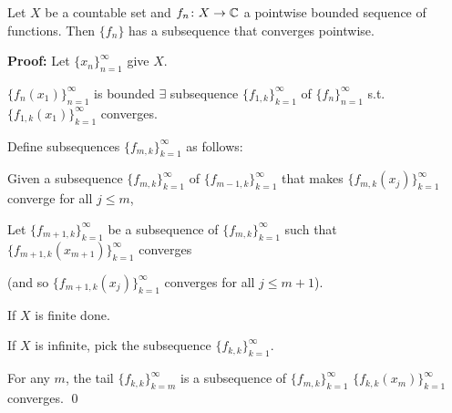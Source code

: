 \documentclass[10pt,aspectratio=169]{beamer}
\begin{document}
\begin{frame}
\begin{proposition}
Let $X$ be a countable set and $f_n \colon X \to {\mathbb{C}}$ a pointwise bounded
sequence of functions.  Then $\{ f_n \}$ has a subsequence that converges
pointwise.
\end{proposition}

\pause

\textbf{Proof:}
Let $\{ x_n \}_{n=1}^{\infty}$ give $X$.

\pause
\medskip

$\{ f_n(x_1) \}_{n=1}^\infty$ is bounded
\wthus
$\exists$
subsequence
$\{ f_{1,k} \}_{k=1}^\infty$
of $\{ f_n \}_{n=1}^{\infty}$
s.t.
$\{ f_{1,k}(x_1) \}_{k=1}^\infty$ converges.


\medskip
\pause

Define subsequences $\{ f_{m,k} \}_{k=1}^\infty$ as follows:

\pause
\medskip

Given a subsequence
$\{ f_{m,k} \}_{k=1}^\infty$ of
$\{ f_{m-1,k} \}_{k=1}^\infty$
that makes $\{ f_{m,k}(x_j) \}_{k=1}^\infty$ converge for all $j \leq m$,
\pause

Let $\{ f_{m+1,k} \}_{k=1}^\infty$ be a subsequence of $\{ f_{m,k} \}_{k=1}^\infty$
such that
$\{ f_{m+1,k}(x_{m+1}) \}_{k=1}^\infty$ converges

\pause
(and so 
$\{ f_{m+1,k}(x_{j}) \}_{k=1}^\infty$ converges for all
$j \leq m+1$).

\pause
\medskip

If $X$ is finite \wthus done.

\pause
\medskip

If $X$ is infinite,
pick the subsequence $\{ f_{k,k} \}_{k=1}^\infty$.

\pause
\medskip

For any $m$, the tail $\{ f_{k,k} \}_{k=m}^\infty$ is a subsequence of $\{ f_{m,k}
\}_{k=1}^\infty$
\wthus
$\{ f_{k,k}(x_m) \}_{k=1}^\infty$ converges.
\qed
\end{frame}
\end{document}
